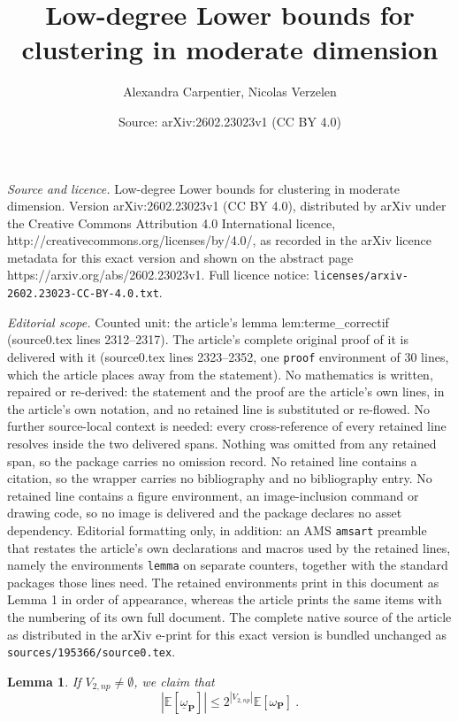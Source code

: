 \documentclass[10pt,a4paper]{amsart}
\title{Low-degree Lower bounds for clustering in moderate dimension}
\author{Alexandra Carpentier, Nicolas Verzelen}
\date{Source: arXiv:2602.23023v1 (CC BY 4.0)}
\newtheorem{lemma}{Lemma}
\begin{document}
\maketitle

\noindent\emph{Source and licence.} Low-degree Lower bounds for clustering in moderate dimension. Version arXiv:2602.23023v1 (CC BY 4.0), distributed by arXiv under the Creative Commons Attribution 4.0 International licence, http://creativecommons.org/licenses/by/4.0/, as recorded in the arXiv licence metadata for this exact version and shown on the abstract page https://arxiv.org/abs/2602.23023v1. Full licence notice: \texttt{licenses/arxiv-2602.23023-CC-BY-4.0.txt}.\par\smallskip

\noindent\textit{Editorial scope.} Counted unit: the article's lemma lem:terme\_correctif (source0.tex lines 2312--2317). The article's complete original proof of it is delivered with it (source0.tex lines 2323--2352, one \texttt{proof} environment of 30 lines, which the article places away from the statement). No mathematics is written, repaired or re-derived: the statement and the proof are the article's own lines, in the article's own notation, and no retained line is substituted or re-flowed.  No further source-local context is needed: every cross-reference of every retained line resolves inside the two delivered spans.  Nothing was omitted from any retained span, so the package carries no omission record.  No retained line contains a citation, so the wrapper carries no bibliography and no bibliography entry.  No retained line contains a figure environment, an image-inclusion command or drawing code, so no image is delivered and the package declares no asset dependency.  Editorial formatting only, in addition: an AMS \texttt{amsart} preamble that restates the article's own declarations and macros used by the retained lines, namely the environments \texttt{lemma} on separate counters, together with the standard packages those lines need.  The retained environments print in this document as Lemma 1 in order of appearance, whereas the article prints the same items with the numbering of its own full document.  The complete native source of the article as distributed in the arXiv e-print for this exact version is bundled unchanged as \texttt{sources/195366/source0.tex}.
    \begin{lemma}\label{lem:terme_correctif}
    If $V_{2,np}\neq \emptyset$, we claim that 
    \[
    \left|   \mathbb{E}\left[ \underline{\omega}_{\mathbf{P}}\right]\right| \leq 2^{|V_{2,np}|}\mathbb{E}\left[\omega_{ \mathbf{P}}\right]\ . 
    \]
    \end{lemma}
\end{document}
